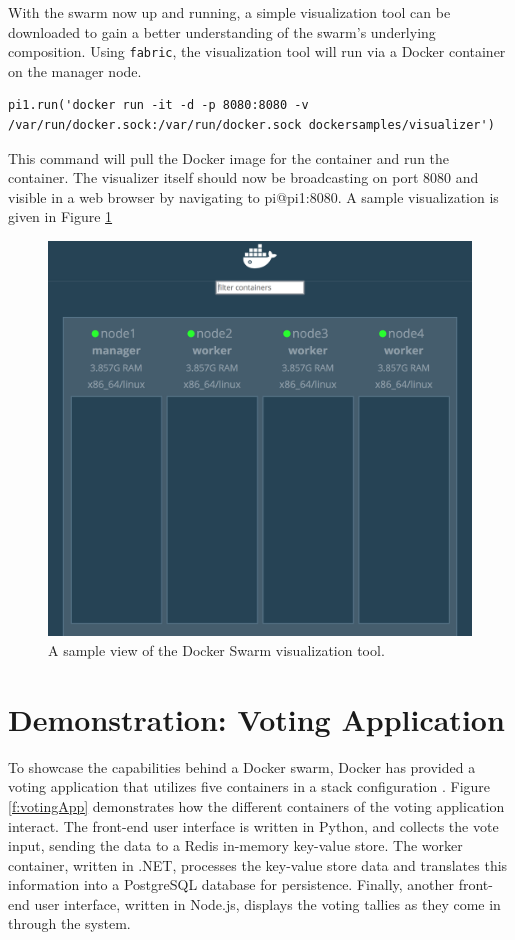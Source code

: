 \documentclass[sigconf]{acmart}
\begin{document}
With the swarm now up and running, a simple visualization tool can be downloaded to gain a better understanding of the 
swarm's underlying composition. Using {\tt fabric}, the visualization tool will run via a Docker container on the manager 
node.

\begin{lstlisting}
pi1.run('docker run -it -d -p 8080:8080 -v /var/run/docker.sock:/var/run/docker.sock dockersamples/visualizer')
\end{lstlisting}

\setlength{\parskip}{1em}\noindent This command will pull the Docker image for the container and run the container. The 
visualizer itself should now be broadcasting on port 8080 and visible in a web browser by navigating to pi@pi1:8080. A 
sample visualization is given in Figure \ref{f:visualizer}

\begin{figure}[!ht]
  \centering\includegraphics[width=\columnwidth]{images/visualizer.png}
  \caption{A sample view of the Docker Swarm visualization tool.}\label{f:visualizer}
\end{figure}

\section{Demonstration: Voting Application}

To showcase the capabilities behind a Docker swarm, Docker has provided a voting application that utilizes five containers 
in a stack configuration \cite{votingapp2017}. Figure \ref{f:votingApp} demonstrates how the different containers of the 
voting application interact. The front-end user interface is written in Python, and collects the vote input, sending the 
data to a Redis in-memory key-value store. The worker container, written in .NET, processes the key-value store data and 
translates this information into a PostgreSQL database for persistence. Finally, another front-end user interface, written 
in Node.js, displays the voting tallies as they come in through the system.
\end{document}
